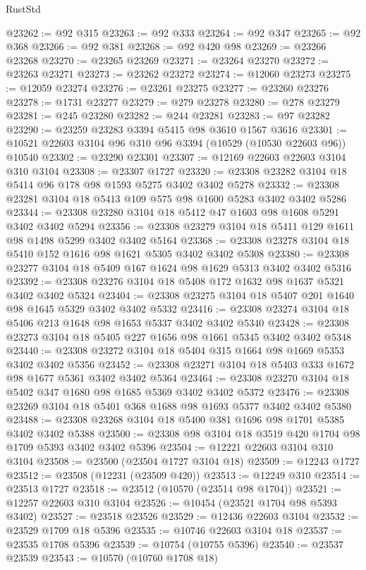 \begin{lexlean}{RustStd}
\begin{coremodule}
@23262 := @92 @315
@23263 := @92 @333
@23264 := @92 @347
@23265 := @92 @368
@23266 := @92 @381
@23268 := @92 @420 @98
@23269 := @23266 @23268
@23270 := @23265 @23269
@23271 := @23264 @23270
@23272 := @23263 @23271
@23273 := @23262 @23272
@23274 := @12060 @23273
@23275 := @12059 @23274
@23276 := @23261 @23275
@23277 := @23260 @23276
@23278 := @1731 @23277
@23279 := @279 @23278
@23280 := @278 @23279
@23281 := @245 @23280
@23282 := @244 @23281
@23283 := @97 @23282
@23290 := @23259 @23283 @3394 @5415 @98 @3610 @1567 @3616
@23301 := @10521 @22603 @3104 @96 @310 @96 @3394 (@10529 (@10530 @22603 @96)) @10540
@23302 := @23290 @23301
@23307 := @12169 @22603 @22603 @3104 @310 @3104
@23308 := @23307 @1727
@23320 := @23308 @23282 @3104 @18 @5414 @96 @178 @98 @1593 @5275 @3402 @3402 @5278
@23332 := @23308 @23281 @3104 @18 @5413 @109 @575 @98 @1600 @5283 @3402 @3402 @5286
@23344 := @23308 @23280 @3104 @18 @5412 @47 @1603 @98 @1608 @5291 @3402 @3402 @5294
@23356 := @23308 @23279 @3104 @18 @5411 @129 @1611 @98 @1498 @5299 @3402 @3402 @5164
@23368 := @23308 @23278 @3104 @18 @5410 @152 @1616 @98 @1621 @5305 @3402 @3402 @5308
@23380 := @23308 @23277 @3104 @18 @5409 @167 @1624 @98 @1629 @5313 @3402 @3402 @5316
@23392 := @23308 @23276 @3104 @18 @5408 @172 @1632 @98 @1637 @5321 @3402 @3402 @5324
@23404 := @23308 @23275 @3104 @18 @5407 @201 @1640 @98 @1645 @5329 @3402 @3402 @5332
@23416 := @23308 @23274 @3104 @18 @5406 @213 @1648 @98 @1653 @5337 @3402 @3402 @5340
@23428 := @23308 @23273 @3104 @18 @5405 @227 @1656 @98 @1661 @5345 @3402 @3402 @5348
@23440 := @23308 @23272 @3104 @18 @5404 @315 @1664 @98 @1669 @5353 @3402 @3402 @5356
@23452 := @23308 @23271 @3104 @18 @5403 @333 @1672 @98 @1677 @5361 @3402 @3402 @5364
@23464 := @23308 @23270 @3104 @18 @5402 @347 @1680 @98 @1685 @5369 @3402 @3402 @5372
@23476 := @23308 @23269 @3104 @18 @5401 @368 @1688 @98 @1693 @5377 @3402 @3402 @5380
@23488 := @23308 @23268 @3104 @18 @5400 @381 @1696 @98 @1701 @5385 @3402 @3402 @5388
@23500 := @23308 @98 @3104 @18 @3519 @420 @1704 @98 @1709 @5393 @3402 @3402 @5396
@23504 := @12221 @22603 @3104 @310 @3104
@23508 := @23500 (@23504 @1727 @3104 @18)
@23509 := @12243 @1727
@23512 := @23508 (@12231 (@23509 @420))
@23513 := @12249 @310
@23514 := @23513 @1727
@23518 := @23512 (@10570 (@23514 @98 @1704))
@23521 := @12257 @22603 @310 @3104
@23526 := @10454 (@23521 @1704 @98 @5393 @3402)
@23527 := @23518 @23526
@23529 := @12436 @22603 @3104
@23532 := @23529 @1709 @18 @5396
@23535 := @10746 @22603 @3104 @18
@23537 := @23535 @1708 @5396
@23539 := @10754 (@10755 @5396)
@23540 := @23537 @23539
@23543 := @10570 (@10760 @1708 @18)

\end{coremodule}
\end{lexlean}

